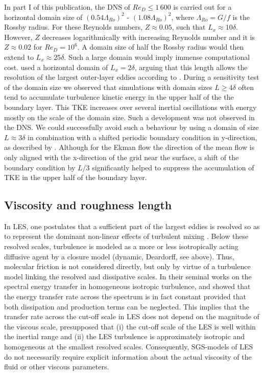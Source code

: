 \documentclass[draft,a4paper,11pt]{article}
\begin{document}
In part I of this publication, the DNS of $Re_D\leq1\,600$ is carried out for a horizontal domain size of $(0.54\Lambda_{Ro})^2$ - $(1.08\Lambda_{Ro})^2$, where $\Lambda_{Ro}=G/f$ is the Rossby radius. For these Reynolds numbers, $Z\approx 0.05$, such that $L_x \approx 10 \delta$. However, $Z$ decreases logarithmically with increasing Reynolds number and it is $Z\approx 0.02$ for $Re_D=10^6$. A domain size of half the Rossby radius would then extend to $L_x\approx 25\delta$. Such a large domain would imply immense computational cost. \cite{spalart2008direct} used a horizontal domain of $L_x = 2\delta$, arguing that this length allows the resolution of the largest outer-layer eddies according to \cite{csanady1967resistance}. During a sensitivity test of the domain size we observed that simulations with domain sizes $L\geq 4\delta$ often tend to accumulate turbulence kinetic energy in the upper half of the the boundary layer. This TKE increases over several inertial oscillations with energy mostly on the scale of the domain size. Such a development was not observed in the DNS. We could successfully avoid such a behaviour by using a domain of size $L \approx 3\delta$ in combination with a shifted periodic boundary condition in y-direction, as described by \cite{munters2016shifted}. Although for the Ekman flow the direction of the mean flow is only aligned with the x-direction of the grid near the surface, a shift of the boundary condition by $L/3$ significantly helped to suppress the accumulation of TKE in the upper half of the boundary layer.

\subsection{Viscosity and roughness length}

In LES, one postulates that a sufficient part of the largest eddies is resolved so as to represent the dominant non-linear effects of turbulent mixing \citep{pope2004ten}. Below these resolved scales, turbulence is modeled as a more or less isotropically acting diffusive agent by a closure model (dynamic, Deardorff, see above). Thus, molecular friction is not considered directly, but only by virtue of a turbulence model linking the resolved and dissipative scales. In their seminal works on the spectral energy transfer in homogeneous isotropic turbulence, \cite{kolmogorov1941dissipation} and \cite{obukhov1941distribution} showed that the energy transfer rate across the spectrum is in fact constant provided that both dissipation and production terms can be neglected. This implies that the transfer rate across the cut-off scale in LES does not depend on the magnitude of the viscous scale, presupposed that (i) the cut-off scale of the LES is well within the inertial range and (ii) the LES turbulence is approximately isotropic and homogeneous at the smallest resolved scales. Consequently, SGS-models of LES do not necessarily require explicit information about the actual viscosity of the fluid or other viscous parameters.
\end{document}

